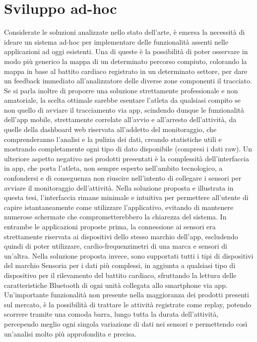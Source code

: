 \documentclass[target=bach,aauheader=,style=]{thud}
\begin{document}
\section{Sviluppo ad-hoc}
Considerate le soluzioni analizzate nello stato dell'arte, è emersa la necessità di ideare un sistema ad-hoc per implementare delle funzionalità assenti nelle applicazioni ad oggi esistenti. Una di queste è la possibilità di poter osservare in modo più generico la mappa di un determinato percorso compiuto, colorando la mappa in base al battito cardiaco registrato in un determinato settore, per dare un feedback immediato all'analizzatore delle diverse zone componenti il tracciato. Se si parla inoltre di proporre una soluzione strettamente professionale e non amatoriale, la scelta ottimale sarebbe esentare l'atleta da qualsiasi compito se non quello di avviare il tracciamento via app, scindendo dunque le funzionalità dell'app mobile, strettamente correlate all'avvio e all'arresto dell'attività, da quelle della dashboard web riservata all'addetto del monitoraggio, che comprenderanno l'analisi e la pulizia dei dati, creando statistiche utili e mostrando completamente ogni tipo di dato disponibile (compresi i dati raw). Un ulteriore aspetto negativo nei prodotti presentati è la complessità dell'interfaccia in app, che porta l'atleta, non sempre esperto nell'ambito tecnologico, a confondersi e di conseguenza non riuscire nell'intento di collegare i sensori per avviare il monitoraggio dell'attività. Nella soluzione proposta e illustrata in questa tesi, l'interfaccia rimane minimale e intuitiva per permettere all'utente di capire istantaneamente come utilizzare l'applicativo, evitando di mantenere numerose schermate che comprometterebbero la chiarezza del sistema. In entrambe le applicazioni proposte prima, la connessione ai sensori era strettamente riservata ai dispositivi dello stesso marchio dell'app, escludendo quindi di poter utilizzare, cardio-frequenzimetri di una marca e sensori di un'altra. Nella soluzione proposta invece, sono supportati tutti i tipi di dispositivi del marchio Sensoria per i dati più complessi, in aggiunta a qualsiasi tipo di dispositivo per il rilevamento del battito cardiaco, sfruttando la lettura delle caratteristiche Bluetooth di ogni unità collegata allo smartphone via app. Un'importante funzionalità non presente nella maggioranza dei prodotti presenti sul mercato, è la possibilità di trattare le attività registrate come replay, potendo scorrere tramite una comoda barra, lungo tutta la durata dell'attività, percependo meglio ogni singola variazione di dati nei sensori e permettendo così un'analisi molto più approfondita e precisa.
\end{document}
